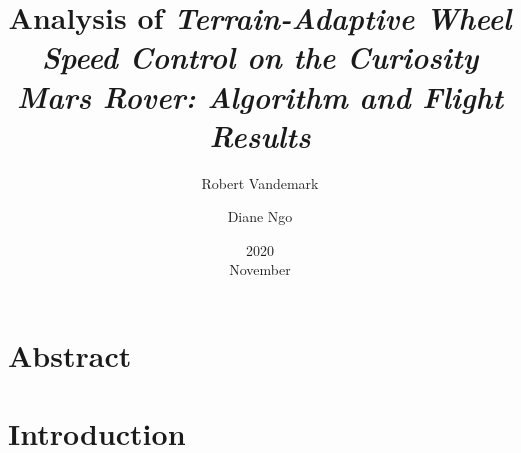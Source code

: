 \documentclass[11pt]{report}
\title{Analysis of \em{Terrain-Adaptive Wheel Speed Control on the Curiosity Mars Rover: Algorithm and Flight Results}}
\date{2020\\ November}
\author{Robert Vandemark \and Diane Ngo}
\begin{document}
	\renewcommand*{\thepage}{\arabic{page}}
	\setcounter{page}{1}
	\setcounter{chapter}{1}
	\maketitle
	
	\section{Abstract}
	

	\section{Introduction}
	
\end{document}
